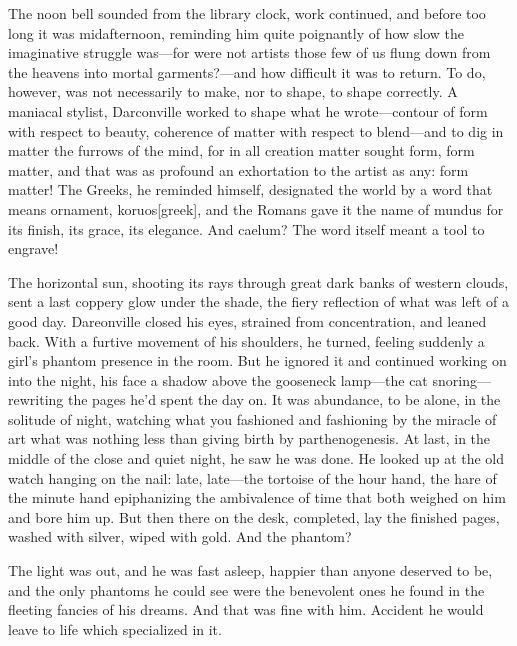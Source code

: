   The noon bell sounded from the library clock, work continued, and before too
long it was midafternoon, reminding him quite poignantly 
of how slow the
imaginative struggle was---for were not artists those few of us flung 
down from the heavens into mortal garments?---and how difficult it was to 
return. To do, however, was not necessarily to make, nor to shape, to shape 
correctly. A maniacal 
stylist, Darconville worked to shape what he wrote---contour of form with
respect to beauty, coherence of matter with respect to blend---and to dig in
matter the furrows 
of the mind, for in all creation matter sought form, form
matter, and that was as profound an exhortation 
to the artist as any: form
matter! The Greeks, he reminded himself, designated the world by a word that
means ornament, koruos[greek], and the Romans gave it the name of mundus for its
finish, its grace, its elegance. And caelum? The word itself meant a tool to
engrave!

  The horizontal sun, shooting its rays through great dark banks of western
clouds, sent a last coppery glow under the shade, the fiery 
reflection of what was left of a good day. Dareonville closed his eyes, 
strained from concentration, and leaned back. With a furtive 
movement of his shoulders, he
turned, feeling suddenly a girl's phantom presence in the room. But he ignored
it and continued working on into the night, his face a shadow above the
gooseneck lamp---the cat snoring---rewriting the pages he'd spent the day on. 
It was abundance, to be alone, in the solitude of night, watching what you 
fashioned and fashioning by the miracle of art what was nothing less than 
giving birth by parthenogenesis. 
At last, in the middle of the close and quiet night, he saw he
was done. He looked up at the old watch hanging on the nail: late, late---the
tortoise of the hour hand, the hare of the minute hand epiphanizing 
the ambivalence of time that both weighed on him and bore him up. But then 
there on the desk, completed, lay the finished pages, washed with silver, 
wiped with gold. And the phantom?

  The light was out, and he was fast asleep, happier than anyone deserved to be,
and the only phantoms he could see were the benevolent ones he found in the
fleeting fancies of his dreams. And that was fine with him. Accident he would
leave to life which specialized in it.
